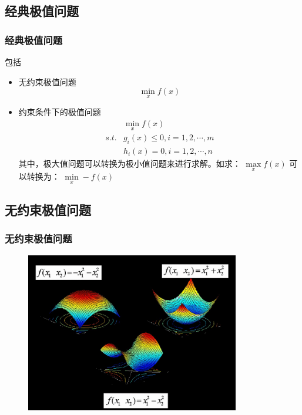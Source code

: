 \documentclass[slidestop,compress,mathserif,c]{beamer}
\begin{document}
\subsection{\hfill 经典极值问题}
\begin{frame}
\frametitle{经典极值问题}
包括
\begin{itemize}
    \item 无约束极值问题
       $$ \min_xf(x) $$ 
    \item 约束条件下的极值问题
      \begin{eqnarray*}
        & \underset{x}{\min}f(x)\\
      s.t. & g_i(x)\leq 0, i=1,2,\cdots,m\\
           & h_i(x)=0, i=1,2,\cdots,n
  \end{eqnarray*}
  其中，极大值问题可以转换为极小值问题来进行求解。如求：
   $ \underset{x}{\max}f(x) $ 
  可以转换为： $ \underset{x}{\min}-f(x) $ 
\end{itemize}

\end{frame}

\subsection{\hfill 无约束极值问题}
\begin{frame}
\frametitle{无约束极值问题}
\begin{figure}[htbp]
  \includegraphics[height=7cm]{noneyueshu.jpg}
\end{figure}

\end{frame}

\end{document}
